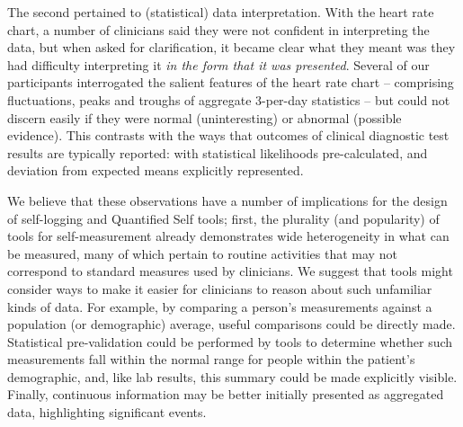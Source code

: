 \documentclass{sigchi}
\begin{document}
The second pertained to (statistical) data interpretation. With the heart rate chart, a number of clinicians said they were not confident in interpreting the data, but when asked for clarification, it became clear what they meant was they had difficulty interpreting it \emph{in the form that it was presented}.  Several of our participants interrogated the salient features of the heart rate chart -- comprising fluctuations, peaks and troughs of aggregate 3-per-day statistics -- but could not discern easily if they were normal (uninteresting) or abnormal (possible evidence). This contrasts with the ways that outcomes of clinical diagnostic test results are  typically reported: with statistical likelihoods pre-calculated, and deviation from expected means explicitly represented.

We believe that these observations have a number of implications for the design of self-logging and Quantified Self tools; first, the plurality (and popularity) of tools for self-measurement already demonstrates wide heterogeneity in what can be measured, many of which pertain to routine activities that may not correspond to standard measures used by clinicians. We suggest that tools might consider ways to make it easier for clinicians to reason about such unfamiliar kinds of data.  For example, by comparing a person's measurements against a population (or demographic) average, useful comparisons could be directly made.  Statistical pre-validation could be performed by tools to determine whether such measurements fall within the normal range for people within the patient's demographic, and, like lab results, this summary could be made explicitly visible. Finally, continuous information may be better initially presented as aggregated data, highlighting significant events. 
\end{document}
